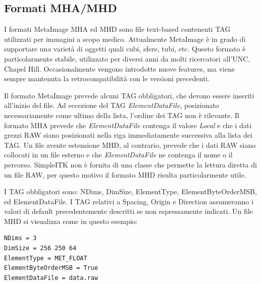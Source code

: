 \documentclass[a4paper,12pt, doubleside]{report}
\begin{document}
            \subsection{Formati MHA/MHD}
                \label{sec:mha}
                \par
                    I formati MetaImage MHA ed MHD sono file text-based contenenti TAG utilizzati per immagini a scopo medico. Attualmente MetaImage è in grado di supportare una varietà di oggetti quali cubi, sfere, tubi, etc. Questo formato è particolarmente stabile, utilizzato per diversi anni da molti ricercatori all'UNC, Chapel Hill. Occasionalmente vengono introdotte nuove features, ma viene sempre mantenuta la retrocompatibilità con le versioni precedenti. 
                
                \bigskip
                \par
                    Il formato MetaImage prevede alcuni TAG obbligatori, che devono essere inseriti all'inizio del file. Ad eccezione del TAG \textit{ElementDataFile}, posizionato necessariamente come ultimo della lista, l'ordine dei TAG non è rilevante. Il formato MHA prevede che \textit{ElementDataFile} contenga il valore \textit{Local} e che i dati grezzi RAW \cite{raw} siano posizionati nella riga immediatamente successiva alla lista dei TAG. Un file avente estensione MHD, al contrario, prevede che i dati RAW siano collocati in un file esterno e che \textit{ElementDataFile} ne contenga il nome o il percorso. SimpleITK non è fornita di una classe che permette la lettura diretta di un file RAW, per questo motivo il formato MHD risulta particolarmente utile.
                
                \bigskip
                \par
                    I TAG obbligatori sono: NDims, DimSize, ElementType, ElementByteOrderMSB, ed ElementDataFile. I TAG relativi a Spacing, Origin e Direction assumeranno i valori di default precedentemente descritti se non espressamente indicati. Un file MHD si visualizza come in questo esempio:
                    
                    \begin{lstlisting}[language=bash, frame=bt]
NDims = 3
DimSize = 256 250 64
ElementType = MET_FLOAT
ElementByteOrderMSB = True
ElementDataFile = data.raw
                    \end{lstlisting}
                    
\end{document}
